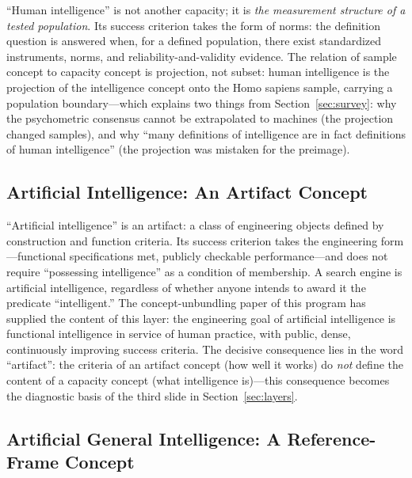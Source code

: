 \documentclass[10pt]{article}
\begin{document}
``Human intelligence'' is not another capacity; it is \emph{the measurement structure of a tested population}. Its success criterion takes the form of norms: the definition question is answered when, for a defined population, there exist standardized instruments, norms, and reliability-and-validity evidence\cite{spearman1904general,mcgrew2023chc,neisser1996intelligence}. The relation of sample concept to capacity concept is projection, not subset: human intelligence is the projection of the intelligence concept onto the Homo sapiens sample, carrying a population boundary---which explains two things from Section~\ref{sec:survey}: why the psychometric consensus cannot be extrapolated to machines (the projection changed samples)\cite{hernandezorallo2017measure}, and why ``many definitions of intelligence are in fact definitions of human intelligence'' (the projection was mistaken for the preimage).

\subsection{Artificial Intelligence: An Artifact Concept}

``Artificial intelligence'' is an artifact: a class of engineering objects defined by construction and function criteria. Its success criterion takes the engineering form---functional specifications met, publicly checkable performance---and does not require ``possessing intelligence'' as a condition of membership. A search engine is artificial intelligence, regardless of whether anyone intends to award it the predicate ``intelligent.'' The concept-unbundling paper of this program has supplied the content of this layer: the engineering goal of artificial intelligence is functional intelligence in service of human practice, with public, dense, continuously improving success criteria\cite{yu2026twogoals}. The decisive consequence lies in the word ``artifact'': the criteria of an artifact concept (how well it works) do \emph{not} define the content of a capacity concept (what intelligence is)---this consequence becomes the diagnostic basis of the third slide in Section~\ref{sec:layers}.

\subsection{Artificial General Intelligence: A Reference-Frame Concept}
\end{document}
